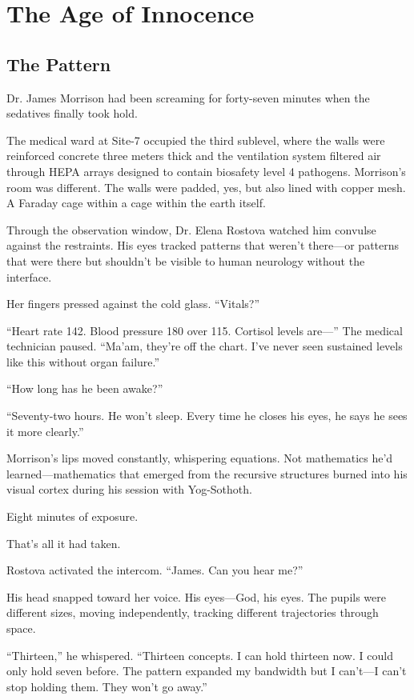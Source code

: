 \part{The Age of Innocence}

\chapter{The Pattern}

Dr. James Morrison had been screaming for forty-seven minutes when the sedatives finally took hold.

The medical ward at Site-7 occupied the third sublevel, where the walls were reinforced concrete three meters thick and the ventilation system filtered air through HEPA arrays designed to contain biosafety level 4 pathogens. Morrison's room was different. The walls were padded, yes, but also lined with copper mesh. A Faraday cage within a cage within the earth itself.

Through the observation window, Dr. Elena Rostova watched him convulse against the restraints. His eyes tracked patterns that weren't there—or patterns that were there but shouldn't be visible to human neurology without the interface.

Her fingers pressed against the cold glass. ``Vitals?''

``Heart rate 142. Blood pressure 180 over 115. Cortisol levels are—'' The medical technician paused. ``Ma'am, they're off the chart. I've never seen sustained levels like this without organ failure.''

``How long has he been awake?''

``Seventy-two hours. He won't sleep. Every time he closes his eyes, he says he sees it more clearly.''

Morrison's lips moved constantly, whispering equations. Not mathematics he'd learned—mathematics that emerged from the recursive structures burned into his visual cortex during his session with Yog-Sothoth.

Eight minutes of exposure.

That's all it had taken.

Rostova activated the intercom. ``James. Can you hear me?''

His head snapped toward her voice. His eyes—God, his eyes. The pupils were different sizes, moving independently, tracking different trajectories through space.

``Thirteen,'' he whispered. ``Thirteen concepts. I can hold thirteen now. I could only hold seven before. The pattern expanded my bandwidth but I can't—I can't stop holding them. They won't go away.''

